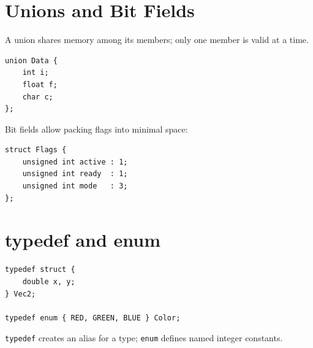 \documentclass[11pt,a4paper]{article}
\begin{document}
\section{Unions and Bit Fields}
A union shares memory among its members; only one member is valid at a time.

\begin{lstlisting}
union Data {
    int i;
    float f;
    char c;
};
\end{lstlisting}

Bit fields allow packing flags into minimal space:
\begin{lstlisting}
struct Flags {
    unsigned int active : 1;
    unsigned int ready  : 1;
    unsigned int mode   : 3;
};
\end{lstlisting}

\section{typedef and enum}
\begin{lstlisting}
typedef struct {
    double x, y;
} Vec2;

typedef enum { RED, GREEN, BLUE } Color;
\end{lstlisting}

\texttt{typedef} creates an alias for a type; \texttt{enum} defines named integer constants.
\end{document}
